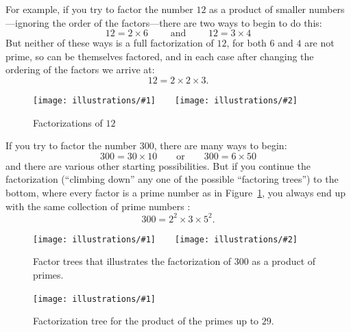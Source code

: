 \documentclass[openany]{book}
\newcommand{\ill}[3]{%
   \begin{figure}[H]%
   \vspace{-2ex}
   \centering%
   \texttt{[image: illustrations/\#1]}%
   \caption{#3}%
   \vspace{-2ex}
    \end{figure}}
\newcommand{\illtwo}[4]{%
   \begin{figure}[H]\centering%
   \texttt{[image: illustrations/\#1]}$\qquad$\texttt{[image: illustrations/\#2]}%
   \caption{#4}%
    \end{figure}}
\theoremstyle{plain}
\theoremstyle{definition}
\begin{document}
For example, if you try to factor the number $12$ as a product of
smaller numbers---ignoring the order of the factors---there are two
ways to begin to do this:
$$
  12 = 2 \times 6 \qquad\text{ and }\qquad   12 = 3 \times 4
$$
But neither of these ways is a full factorization of $12$, for both
$6$ and $4$ are not prime, so can be themselves factored, and in each
case after changing the ordering of the factors we arrive at:
$$
   12= 2 \times 2 \times 3.
$$
\illtwo{factor_tree_12}{factor_tree_12b}{0.3}{Factorizations of $12$}

If you try to factor the number $300$, there are many
ways to begin:
$$
  300= 30\times 10\qquad\text{or}\qquad 300 = 6 \times 50
$$
and there are various other starting possibilities. But if you
continue the factorization (``climbing down'' any one of the possible
``factoring trees'') to the bottom, where every factor is a prime
number as in Figure~\ref{fig:factor300}, you always end up with the
same collection of prime numbers :
                 $$300 = 2^2\times 3\times 5^2.$$   

\illtwo{factor_tree_300_a}{factor_tree_300_b}{.47}
{Factor trees that illustrates the factorization of 300 as a product of primes.\label{fig:factor300}}

\ill{factor_tree_big}{1}{Factorization tree for the product of the primes up to $29$.\label{factor.tree.big}}
 
\end{document}

